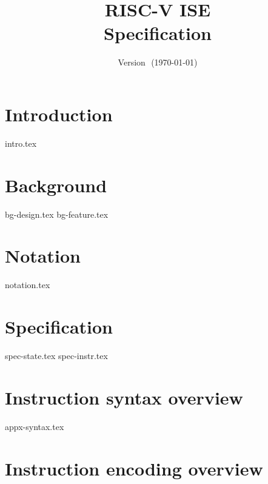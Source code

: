 \documentclass{article}
\title{RISC-V \XCID ISE \\ Specification}
\author{}
\date{Version $$ (\today)}
\begin{document}
\maketitle \tableofcontents


\section{Introduction}
\label{sec:intro}

{intro.tex}

\section{Background}
\label{sec:bg}

{bg-design.tex}
{bg-feature.tex}

\section{Notation}
\label{sec:notation}

{notation.tex}

\section{Specification}
\label{sec:spec}

{spec-state.tex}
{spec-instr.tex}


\newpage
\printbibliography


\appendix

\newpage
\section{Instruction syntax   overview}
\label{appx:syntax}

{appx-syntax.tex}

\newpage
\section{Instruction encoding overview} 
\label{appx:encoding}
\end{document}
